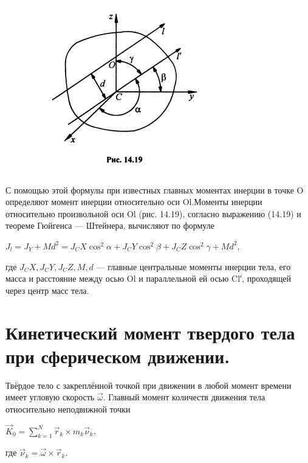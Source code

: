 {\begin{center}
    \par \begin{figure}[H]
    \centering\includegraphics[scale=0.7]{img/14.19.jpg} 
    \end{figure}

    \par С помощью этой формулы при известных главных моментах инерции в точке O определяют момент инерции относительно оси Ol.Моменты инерции относительно произвольной оси Ol (рис. 14.19), согласно выражению (14.19) и теореме Гюйгенса — Штейнера, вычисляют по формуле
    \par $J_l = J_Y +M d^2 = J_CX \cos^2{\alpha} + J_CY \cos^2{\beta} + J_CZ \cos^2{\gamma} + M d^2$,
    
    \par где $J_CX, J_CY, J_CZ, M, d$  —  главные  центральные  моменты  инерции  тела,  его масса и расстояние между осью Ol и параллельной ей осью  Cl′,  проходящей через центр масс тела.

    
\end{center}
\section{Кинетический момент твердого тела при сферическом движении.}
\begin{center}
    \par Твёрдое тело с закреплённой точкой  при движении в любой момент времени имеет угловую скорость $\vec\omega$. Главный момент количеств движения тела относительно неподвижной точки

     \par $\vec K_0 = \sum\limits_{k=1}^N \vec r_k \times m_k \vec\nu_k$,

     \par где $\vec\nu_k = \vec\omega \times \vec r_k$.


\end{center}}
